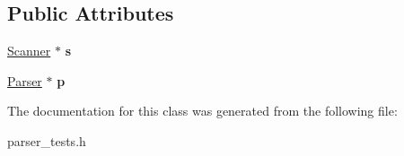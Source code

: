 \subsection*{Public Attributes}
\begin{DoxyCompactItemize}
\item 
\hypertarget{classParserTestSuite_a0c4943b3d23b79be363ba9e1ac7c02ed}{\hyperlink{classScanner}{Scanner} $\ast$ {\bfseries s}}\label{classParserTestSuite_a0c4943b3d23b79be363ba9e1ac7c02ed}

\item 
\hypertarget{classParserTestSuite_a1d637f2f8be1326423ee5b4fd270c553}{\hyperlink{classParser}{Parser} $\ast$ {\bfseries p}}\label{classParserTestSuite_a1d637f2f8be1326423ee5b4fd270c553}

\end{DoxyCompactItemize}


The documentation for this class was generated from the following file\-:\begin{DoxyCompactItemize}
\item 
parser\-\_\-tests.\-h\end{DoxyCompactItemize}

